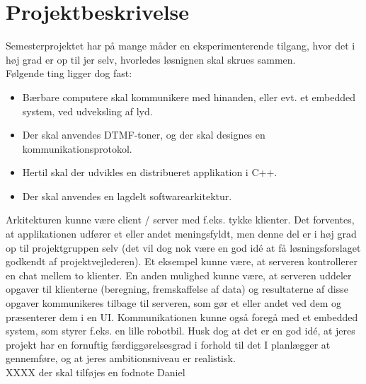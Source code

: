 \section{Projektbeskrivelse}
Semesterprojektet har på mange måder en eksperimenterende tilgang, hvor det i høj grad er op til jer selv, hvorledes løsnignen skal skrues sammen.\\

Følgende ting ligger dog fast:
\begin{itemize}
  \item Bærbare computere skal kommunikere med hinanden, eller evt. et embedded system, ved udveksling af lyd.
  \item Der skal anvendes DTMF-toner, og der skal designes en kommunikationsprotokol.
  \item Hertil skal der udvikles en distribueret applikation i C++.
  \item Der skal anvendes en lagdelt softwarearkitektur.
\end{itemize}

Arkitekturen kunne være client / server med f.eks. tykke klienter.
Det forventes, at applikationen udfører et eller andet meningsfyldt, men denne del er i høj grad op til projektgruppen selv (det vil dog nok være en god idé at få løsningsforslaget godkendt af projektvejlederen). Et eksempel kunne være, at serveren kontrollerer en chat mellem to klienter. En anden mulighed kunne være, at serveren uddeler opgaver til klienterne (beregning, fremskaffelse af data) og resultaterne af disse opgaver kommunikeres tilbage til serveren, som gør et eller andet ved dem og præsenterer dem i en UI. Kommunikationen kunne også foregå med et embedded system, som styrer f.eks. en lille robotbil. Husk dog at det er en god idé, at jeres projekt har en fornuftig færdiggørelsesgrad i forhold til det I planlægger at gennemføre, og at jeres ambitionsniveau er realistisk.\\

XXXX der skal tilføjes en fodnote Daniel
